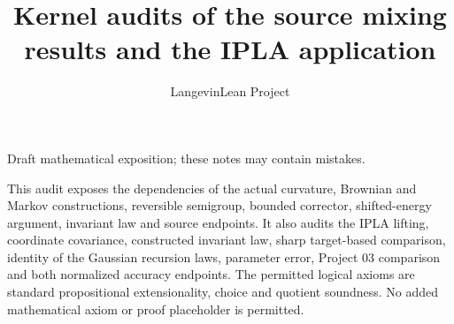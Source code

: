 \documentclass[11pt,a4paper]{article}
\title{\texorpdfstring{Kernel audits of the source mixing results and the IPLA application}{Kernel audits of the source mixing results and the IPLA application}}
\author{LangevinLean Project}
\date{}
\begin{document}
\maketitle
Draft mathematical exposition; these notes may contain mistakes.


This audit exposes the dependencies of the actual curvature, Brownian and Markov constructions, reversible semigroup, bounded corrector, shifted-energy argument, invariant law and source endpoints. It also audits the IPLA lifting, coordinate covariance, constructed invariant law, sharp target-based comparison, identity of the Gaussian recursion laws, parameter error, Project 03 comparison and both normalized accuracy endpoints. The permitted logical axioms are standard propositional extensionality, choice and quotient soundness. No added mathematical axiom or proof placeholder is permitted.
\end{document}
